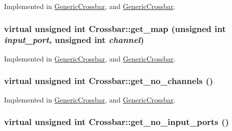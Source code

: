 Implemented in \hyperlink{classGenericCrossbar_50c8203133960f74f6d82649b0c864be}{GenericCrossbar}, and \hyperlink{classGenericCrossbar_50c8203133960f74f6d82649b0c864be}{GenericCrossbar}.\hypertarget{classCrossbar_b7a6eee3263359c40f24dde01decfa20}{
\subsubsection[{get\_\-map}]{\setlength{\rightskip}{0pt plus 5cm}virtual unsigned int Crossbar::get\_\-map (unsigned int {\em input\_\-port}, \/  unsigned int {\em channel})}}
\label{classCrossbar_b7a6eee3263359c40f24dde01decfa20}




Implemented in \hyperlink{classGenericCrossbar_65b435392191561b7a4759e20aacab4e}{GenericCrossbar}, and \hyperlink{classGenericCrossbar_65b435392191561b7a4759e20aacab4e}{GenericCrossbar}.\hypertarget{classCrossbar_a8e1c2a18960f4e6b9c076246239b092}{
\subsubsection[{get\_\-no\_\-channels}]{\setlength{\rightskip}{0pt plus 5cm}virtual unsigned int Crossbar::get\_\-no\_\-channels ()}}
\label{classCrossbar_a8e1c2a18960f4e6b9c076246239b092}




Implemented in \hyperlink{classGenericCrossbar_945a3d32809787bd2c5ee68714467467}{GenericCrossbar}, and \hyperlink{classGenericCrossbar_945a3d32809787bd2c5ee68714467467}{GenericCrossbar}.\hypertarget{classCrossbar_ec960231980043c3669add726b239e50}{
\subsubsection[{get\_\-no\_\-input\_\-ports}]{\setlength{\rightskip}{0pt plus 5cm}virtual unsigned int Crossbar::get\_\-no\_\-input\_\-ports ()}}
\label{classCrossbar_ec960231980043c3669add726b239e50}




